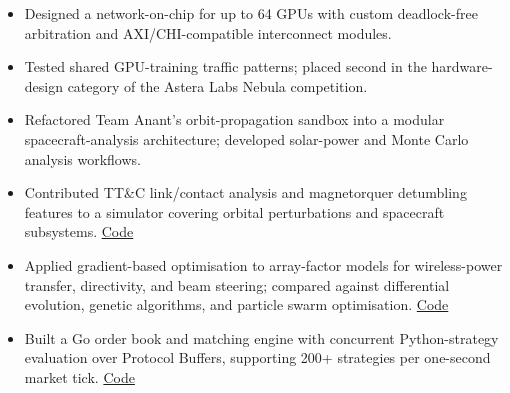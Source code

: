 \documentclass[a4paper, 11pt]{article}
\begin{document}
\begin{samepage}
\begin{itemize}
    \item Designed a network-on-chip for up to 64 GPUs with custom deadlock-free arbitration and AXI/CHI-compatible interconnect modules.
    \item Tested shared GPU-training traffic patterns; placed second in the hardware-design category of the Astera Labs Nebula competition.
\end{itemize}
\end{samepage}

\begin{samepage}
\begin{itemize}
    \item Refactored Team Anant's orbit-propagation sandbox into a modular spacecraft-analysis architecture; developed solar-power and Monte Carlo analysis workflows.
    \item Contributed TT\&C link/contact analysis and magnetorquer detumbling features to a simulator covering orbital perturbations and spacecraft subsystems. \href{https://github.com/team-anant/sat-sim}{Code}
\end{itemize}
\end{samepage}

\begin{samepage}
\begin{itemize}
    \item Applied gradient-based optimisation to array-factor models for wireless-power transfer, directivity, and beam steering; compared against differential evolution, genetic algorithms, and particle swarm optimisation. \href{https://github.com/ProAltro/Gradient-Based-Antenna-Array-Optimisation}{Code}
\end{itemize}
\end{samepage}

\begin{samepage}
\begin{itemize}
    \item Built a Go order book and matching engine with concurrent Python-strategy evaluation over Protocol Buffers, supporting 200+ strategies per one-second market tick. \href{https://github.com/ProAltro/algo-trading-platform}{Code}
\end{itemize}
\end{samepage}
\end{document}
